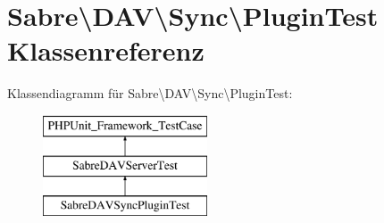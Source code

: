 \hypertarget{class_sabre_1_1_d_a_v_1_1_sync_1_1_plugin_test}{}\section{Sabre\textbackslash{}D\+AV\textbackslash{}Sync\textbackslash{}Plugin\+Test Klassenreferenz}
\label{class_sabre_1_1_d_a_v_1_1_sync_1_1_plugin_test}
Klassendiagramm für Sabre\textbackslash{}D\+AV\textbackslash{}Sync\textbackslash{}Plugin\+Test\+:\begin{figure}[H]
\begin{center}
\leavevmode
\includegraphics[height=3.000000cm]{class_sabre_1_1_d_a_v_1_1_sync_1_1_plugin_test}
\end{center}
\end{figure}
